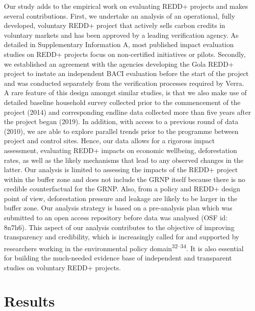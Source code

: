 \documentclass[
]{article}
\begin{document}
Our study adds to the empirical work on evaluating REDD+ projects and
makes several contributions. First, we undertake an analysis of an
operational, fully developed, voluntary REDD+ project that actively
sells carbon credits in voluntary markets and has been approved by a
leading verification agency. As detailed in Supplementary Information A,
most published impact evaluation studies on REDD+ projects focus on
non-certified initiatives or pilots. Secondly, we established an
agreement with the agencies developing the Gola REDD+ project to instate
an independent BACI evaluation before the start of the project and was
conducted separately from the verification processes required by Verra.
A rare feature of this design amongst similar studies, is that we also
make use of detailed baseline household survey collected prior to the
commencement of the project (2014) and corresponding endline data
collected more than five years after the project began (2019). In
addition, with access to a previous round of data (2010), we are able to
explore parallel trends prior to the programme between project and
control sites. Hence, our data allows for a rigorous impact assessment,
evaluating REDD+ impacts on economic wellbeing, deforestation rates, as
well as the likely mechanisms that lead to any observed changes in the
latter. Our analysis is limited to assessing the impacts of the REDD+
project within the buffer zone and does not include the GRNP itself
because there is no credible counterfactual for the GRNP. Also, from a
policy and REDD+ design point of view, deforestation pressure and
leakage are likely to be larger in the buffer zone. Our analysis
strategy is based on a pre-analysis plan which was submitted to an open
access repository before data was analysed (OSF id: 8n7h6). This aspect
of our analysis contributes to the objective of improving transparency
and credibility, which is increasingly called for and supported by
researchers working in the environmental policy
domain\textsuperscript{32--34}. It is also essential for building the
much-needed evidence base of independent and transparent studies on
voluntary REDD+ projects.

\hypertarget{results}{%
\section{Results}\label{results}}
\end{document}
